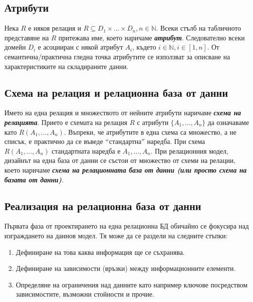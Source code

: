 \documentclass[fleqn,12pt]{article}
\begin{document}
\subsection{Атрибути}

Нека $R$ е някоя релация и $R \subseteq D_1 \times \dots \times D_n, n \in \mathbb{N}$.
Всеки стълб на табличното представяне на $R$ притежава име, което наричаме \textbf{\textit{атрибут}}.
Следователно всеки домейн $D_i$ е асоцииран с някой атрибут $A_i$, където $i \in \mathbb{N}, i \in [1, n]$.
\bigbreak
От семантична/практична гледна точка атрибутите се използват за описване на характеристиките на складираните данни.

\subsection{Схема на релация и релационна база от данни}

Името на една релация и множеството от нейните атрибути наричаме \textbf{\textit{схема на релацията}}.
Прието е схемата на релация $R$ с атрибути $\{A_1, \dots, A_n\}$ да означаваме като $R(A_1, \dots, A_n)$.
\bigbreak
Въпреки, че атрибутите в една схема са множество, а не списък, е практично да се въведе $``$стандартна$''$ наредба.
При схема $R(A_1, \dots, A_n)$ стандартната наредба е $A_1, \dots, A_n$.
\bigbreak
При релационния модел, дизайнът на една база от данни се състои от множество от схеми на релации, което наричаме \textbf{\textit{схема на релационната база от данни (или просто схема на базата от данни)}}.

\subsection{Реализация на релационна база от данни}

Първата фаза от проектирането на една релационна БД обичайно се фокусира над изграждането на даннов модел.
Тя може да се раздели на следните стъпки:
\begin{enumerate}
    \item Дефиниране на това каква информация ще се съхранява.
    \item Дефиниране на зависимости (връзки) между информационните елементи.
    \item Определяне на ограничения над данните като например ключове посредством зависимостите, възможни стойности и прочие.
\end{enumerate}
\end{document}
